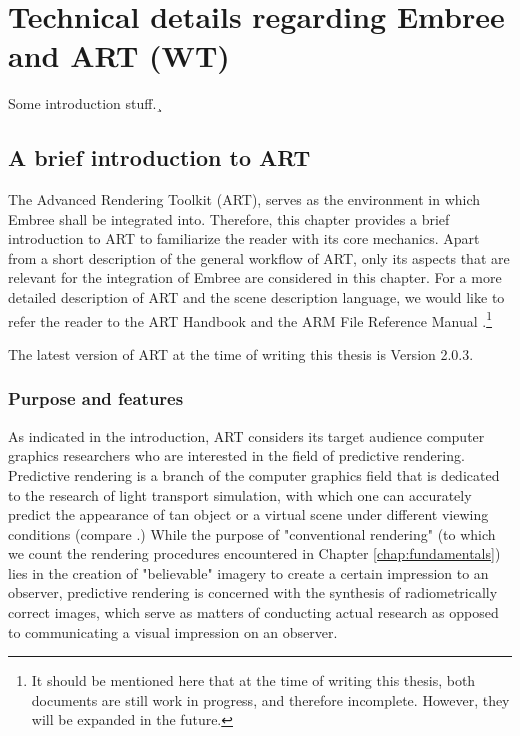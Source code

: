 \chapter{Technical details regarding Embree and ART (WT)}

Some introduction stuff.¸ 

\section{A brief introduction to ART}
\label{chap:art}

The Advanced Rendering Toolkit (ART), serves as the environment in which Embree shall be integrated into. Therefore, this chapter provides a brief introduction to ART to familiarize the reader with its core mechanics. Apart from a short description of the general workflow of ART, only its aspects that are relevant for the integration of Embree are considered in this chapter. For a more detailed description of ART and the scene description language, we would like to refer the reader to the ART Handbook \cite{arthandbook} and the ARM File Reference Manual \cite{artreferencemanual}.\footnote{It should be mentioned here that at the time of writing this thesis, both documents are still work in progress, and therefore incomplete. However, they will be expanded in the future.}

The latest version of ART at the time of writing this thesis is Version 2.0.3.


\subsection{Purpose and features}

As indicated in the introduction, ART considers its target audience computer graphics researchers who are interested in the field of predictive rendering. Predictive rendering is a branch of the computer graphics field that is dedicated to the research of light transport simulation, with which one can accurately predict the appearance of tan object or a virtual scene under different viewing conditions (compare \cite{wilkie2009predictive}.)  While the purpose of "conventional rendering" (to which we count the rendering procedures encountered in Chapter \ref{chap:fundamentals}) lies in the creation of "believable" imagery to create a certain impression to an observer, predictive rendering is concerned with the synthesis of radiometrically correct images, which serve as matters of conducting actual research as opposed to communicating a visual impression on an observer.

